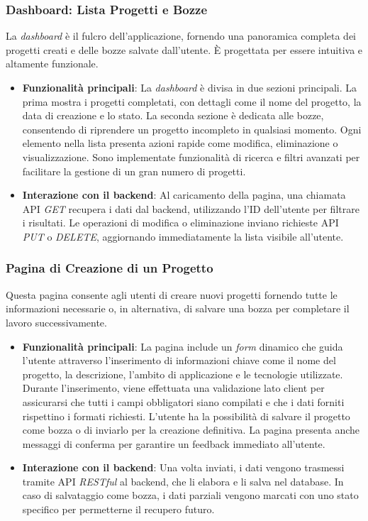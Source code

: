 \subsubsection{Dashboard: Lista Progetti e Bozze}
La \textit{dashboard} è il fulcro dell'applicazione, fornendo una panoramica completa dei progetti creati e delle bozze salvate dall'utente. È progettata per essere intuitiva e altamente funzionale.
\begin{itemize}
    \item \textbf{Funzionalità principali}: La \textit{dashboard} è divisa in due sezioni principali. La prima mostra i progetti completati, con dettagli come il nome del progetto, la data di creazione e lo stato. La seconda sezione è dedicata alle bozze, consentendo di riprendere un progetto incompleto in qualsiasi momento. Ogni elemento nella lista presenta azioni rapide come modifica, eliminazione o visualizzazione. Sono implementate funzionalità di ricerca e filtri avanzati per facilitare la gestione di un gran numero di progetti.
    \item \textbf{Interazione con il \gls{backend}}: Al caricamento della pagina, una chiamata API \textit{GET} recupera i dati dal \gls{backend}, utilizzando l'ID dell'utente per filtrare i risultati. Le operazioni di modifica o eliminazione inviano richieste API \textit{PUT} o \textit{DELETE}, aggiornando immediatamente la lista visibile all'utente.
\end{itemize}

\subsubsection{Pagina di Creazione di un Progetto}
Questa pagina consente agli utenti di creare nuovi progetti fornendo tutte le informazioni necessarie o, in alternativa, di salvare una bozza per completare il lavoro successivamente. 
\begin{itemize}
    \item \textbf{Funzionalità principali}: La pagina include un \textit{form} dinamico che guida l'utente attraverso l'inserimento di informazioni chiave come il nome del progetto, la descrizione, l'ambito di applicazione e le tecnologie utilizzate. Durante l'inserimento, viene effettuata una validazione lato client per assicurarsi che tutti i campi obbligatori siano compilati e che i dati forniti rispettino i formati richiesti. L'utente ha la possibilità di salvare il progetto come bozza o di inviarlo per la creazione definitiva. La pagina presenta anche messaggi di conferma per garantire un feedback immediato all'utente.
    \item \textbf{Interazione con il \gls{backend}}: Una volta inviati, i dati vengono trasmessi tramite API \textit{RESTful} al \gls{backend}, che li elabora e li salva nel database. In caso di salvataggio come bozza, i dati parziali vengono marcati con uno stato specifico per permetterne il recupero futuro.
\end{itemize}

